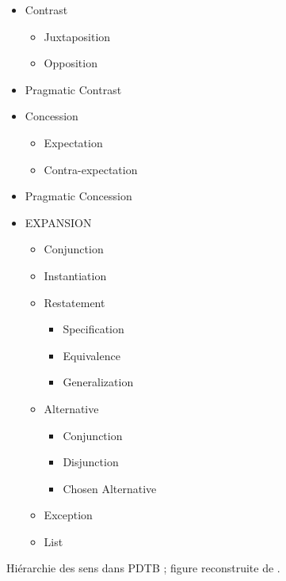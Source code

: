 \documentclass{KBook}
\begin{document}
\begin{figure}[!ht]
\begin{minipage}{.3\textwidth}
\begin{itemize}
	\begin{itemize}
		\item Contrast
		\begin{itemize}
			\item Juxtaposition 
			\item Opposition
		\end{itemize}
		\item Pragmatic Contrast
		\item Concession
		\begin{itemize}
			\item Expectation
			\item Contra-expectation
		\end{itemize}
		\item Pragmatic Concession
	\end{itemize}
\end{itemize}
\end{minipage}
\begin{minipage}{.3\textwidth}
	\scriptsize\bfseries
	\begin{itemize}
		\item EXPANSION
		\begin{itemize}
			\item Conjunction
			\item Instantiation
			\item Restatement
			\begin{itemize}
				\item Specification
				\item Equivalence
				\item Generalization
			\end{itemize}
			\item Alternative
			\begin{itemize}
				\item Conjunction
				\item Disjunction
				\item Chosen Alternative
			\end{itemize}
			\item Exception
			\item List
		\end{itemize}
	\end{itemize}
\end{minipage}\vspace{-0.5cm}
	\caption[Hiérarchie des sens dans PDTB]{Hiérarchie des sens dans PDTB ; figure reconstruite de \cite{2008-prasad-al}.}
	\label{fig:pdtb-rel}
\end{figure}
\end{document}
